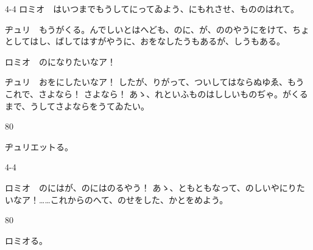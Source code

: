 \documentclass[tate,paper=b6j,jafontsize=9pt]{jlreq}
\begin{document}
\begin{azconvIndented}{4\zw}{-4\zw}
ロミオ　はいつまでもうしてにってゐよう、にもれさせ、もののはれて。

ヂュリ　もうがくる。んでしいとはへども、のに、が、ののやうにをけて、ちょとしてはし、ばしてはすがやうに、おをなしたうもあるが、しうもある。

ロミオ　のになりたいなア！

ヂュリ　おをにしたいなア！ したが、りがって、ついしてはならぬゆゑ、もうこれで、さよなら！ さよなら！ あゝ、れといふものはししいものぢゃ。がくるまで、うしてさよならをうてゐたい。

\end{azconvIndented}
\begin{azconvIndented}{8\zw}{0\zw}

ヂュリエットる。

\end{azconvIndented}
\begin{azconvIndented}{4\zw}{-4\zw}

ロミオ　のにはが、のにはのるやう！ あゝ、ともともなって、のしいやにりたいなア！……これからのへて、のせをした、かとをめよう。

\end{azconvIndented}
\begin{azconvIndented}{8\zw}{0\zw}

ロミオる。

\end{azconvIndented}
\end{document}
